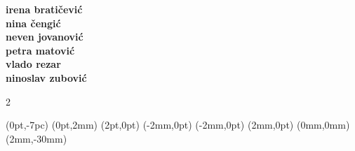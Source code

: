 \documentclass{article}
\begin{document}
  \NewCoffin \result
  \NewCoffin \aaa
  \NewCoffin \bbb
  \NewCoffin \ddd
  \NewCoffin \eee
  \NewCoffin \fff
  \NewCoffin {}
  \NewCoffin {}
  \NewCoffin {}

\SetHorizontalCoffin \result {}
\SetHorizontalCoffin {}
\SetHorizontalCoffin {}
\SetHorizontalCoffin {}
\SetHorizontalCoffin \eee {}
\SetVerticalCoffin \fff {140pt}
                 {\raggedright {\color{gray} \fontsize{13}{14}\sffamily\bfseries
                 irena bratičević\\
                 nina čengić\\
                 neven jovanović\\
                 petra matović\\
                 vlado rezar\\
                 ninoslav zubović\\
                 }}

\RotateCoffin {}

\ScaleCoffin {} {2}

\SetHorizontalCoffin {}
\SetHorizontalCoffin {}
\SetHorizontalCoffin {}


\JoinCoffins \result                \aaa	[B,l](0pt,-7pc)
\JoinCoffins {} (0pt,2mm)
\JoinCoffins {} \bbb     [B,r](2pt,0pt)
\JoinCoffins {} (-2mm,0pt)
\JoinCoffins {} \fff     [t,r](-2mm,0pt)
\JoinCoffins {} (2mm,0pt)
\JoinCoffins {} \ddd     [B,r](0mm,0mm)
\JoinCoffins {} \eee    [t,r](2mm,-30mm)
\TypesetCoffin \result
\end{document}
